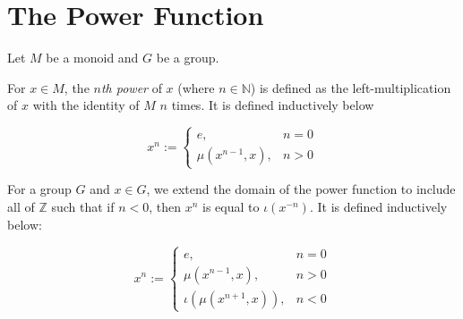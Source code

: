 \section{The Power Function}

Let $M$ be a monoid and $G$ be a group.

\begin{definition}
    \label{definition : mpow}
    \leanok
    For $x \in M$, the \textit{$n$th power} of $x$ (where $n \in \mathbb{N}$) is defined as the left-multiplication of $x$ with the identity of $M$ $n$ times. It is defined inductively below

    \begin{equation*}
        x^n := \begin{cases}
            e, & n = 0 \\
            \mu(x^{n-1}, x), & n > 0
        \end{cases}
    \end{equation*}
\end{definition}

\begin{definition}
    \label{definition : gpow}
    \leanok
    For a group $G$ and $x \in G$, we extend the domain of the power function to include all of $\mathbb{Z}$ such that if $n < 0$, then $x^n$ is equal to $\iota(x^{-n})$. It is defined inductively below:

    \begin{equation*}
        x^n := \begin{cases}
            e, & n = 0 \\
            \mu(x^{n-1}, x), & n > 0 \\
            \iota(\mu(x^{n+1}, x)), & n < 0
        \end{cases}
    \end{equation*}
\end{definition}
